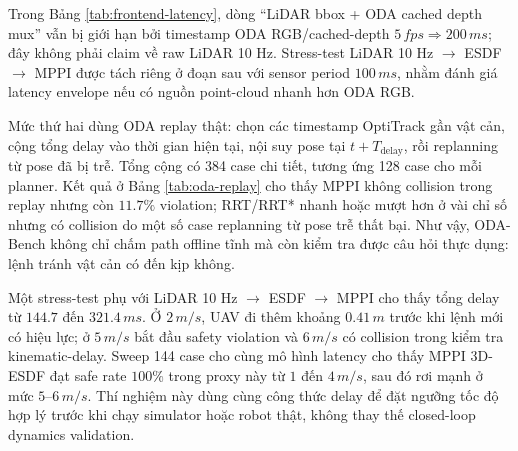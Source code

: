 \documentclass[10pt,letterpaper,twocolumn]{article}
\begin{document}
Trong Bảng \ref{tab:frontend-latency}, dòng ``LiDAR bbox + ODA cached depth mux'' vẫn bị giới hạn bởi timestamp ODA RGB/cached-depth \(5\,fps\Rightarrow200\,ms\); đây không phải claim về raw LiDAR 10 Hz. Stress-test LiDAR 10 Hz \(\rightarrow\) ESDF \(\rightarrow\) MPPI được tách riêng ở đoạn sau với sensor period \(100\,ms\), nhằm đánh giá latency envelope nếu có nguồn point-cloud nhanh hơn ODA RGB.

Mức thứ hai dùng ODA replay thật: chọn các timestamp OptiTrack gần vật cản, cộng tổng delay vào thời gian hiện tại, nội suy pose tại \(t+T_{\mathrm{delay}}\), rồi replanning từ pose đã bị trễ. Tổng cộng có 384 case chi tiết, tương ứng 128 case cho mỗi planner. Kết quả ở Bảng \ref{tab:oda-replay} cho thấy MPPI không collision trong replay nhưng còn \(11.7\%\) violation; RRT/RRT* nhanh hoặc mượt hơn ở vài chỉ số nhưng có collision do một số case replanning từ pose trễ thất bại. Như vậy, ODA-Bench không chỉ chấm path offline tĩnh mà còn kiểm tra được câu hỏi thực dụng: lệnh tránh vật cản có đến kịp không.

\begin{table}[!t]
\centering
\footnotesize
\caption{ODA replay online feasibility theo planner.}
\label{tab:oda-replay}
\end{table}

Một stress-test phụ với LiDAR 10 Hz \(\rightarrow\) ESDF \(\rightarrow\) MPPI cho thấy tổng delay từ \(144.7\) đến \(321.4\,ms\). Ở \(2\,m/s\), UAV đi thêm khoảng \(0.41\,m\) trước khi lệnh mới có hiệu lực; ở \(5\,m/s\) bắt đầu safety violation và \(6\,m/s\) có collision trong kiểm tra kinematic-delay. Sweep 144 case cho cùng mô hình latency cho thấy MPPI 3D-ESDF đạt safe rate \(100\%\) trong proxy này từ \(1\) đến \(4\,m/s\), sau đó rơi mạnh ở mức \(5\)--\(6\,m/s\). Thí nghiệm này dùng cùng công thức delay để đặt ngưỡng tốc độ hợp lý trước khi chạy simulator hoặc robot thật, không thay thế closed-loop dynamics validation.
\end{document}
